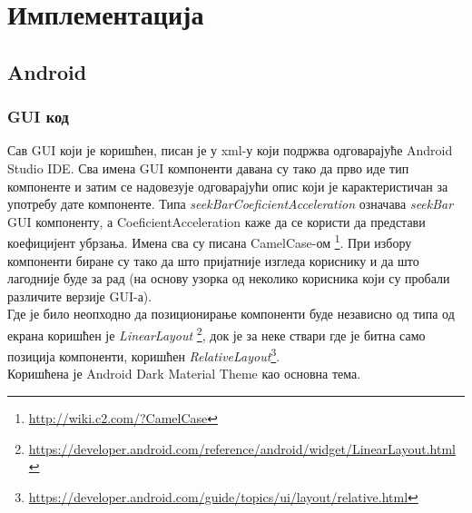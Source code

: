 \chapter{Имплементација} \label{Impl}

\section{Android}\label{Android}

\subsection{GUI код}
Сав GUI који је коришћен, писан је у xml-у који подржва одговарајуће Android Studio IDE. Сва имена GUI компоненти давана су тако да прво иде тип компоненте и затим се надовезује одговарајући опис који је карактеристичан за употребу дате компоненте. Типа \emph{seekBarCoeficientAcceleration} означава \emph{seekBar} GUI компоненту, а CoeficientAcceleration каже да се користи да представи коефицијент убрзања. Имена сва су писана CamelCase-ом \footnote{\url{http://wiki.c2.com/?CamelCase}}. При избору компоненти биране су тако да што пријатније изгледа кориснику и да што лагодније буде за рад (на основу узорка од неколико корисника који су пробали различите верзије GUI-а). 
\\ \indent 
Где је било неопходно да позиционирање компоненти буде независно од типа од екрана коришћен је \emph{LinearLayout}
\footnote{\url{https://developer.android.com/reference/android/widget/LinearLayout.html}}, 
док је за неке ствари где је битна само позиција компоненти, коришћен \emph{RelativeLayout}\footnote{\url{https://developer.android.com/guide/topics/ui/layout/relative.html}}.
\\ \indent 
Коришћена је Android Dark Material Theme као основна тема.

